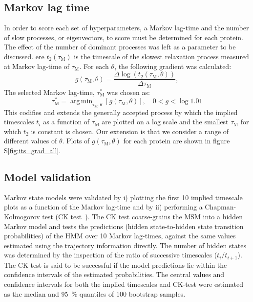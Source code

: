 \documentclass[journal=jacsat,manuscript=article]{achemso}
\DeclareMathOperator*{\argmin}{arg\,min}
\newcommand*\sref[1]{%
    S\ref{#1}}
\begin{document}
\subsection{Markov lag time}
In order to score each set of hyperparameters, a Markov lag-time and the number of slow processes, or eigenvectors, to score must be determined for each protein. The effect of the number of dominant processes was left as a parameter to be discussed. ere $t_{2}(\tau_{\mathrm{M}})$ is the timescale of the slowest relaxation process measured at Markov lag-time of $\tau_{\mathrm{M}}$. 
For each $\theta$, the following gradient was calculated:
\begin{equation}
    g(\tau_{\mathrm{M}}, \theta) = \frac{\Delta \log{\left(t_{2}(\tau_{\mathrm{M}}, \theta)\right)}}{\Delta \tau_{\mathrm{M}}}, 
\end{equation}\label{eqn:choose_lag_1}
The selected Markov lag-time, $\tau^{*}_{\mathrm{M}}$ was chosen as:
\begin{equation}
    \tau^{*}_{\mathrm{M}}  = \argmin_{\tau_{\mathrm{M}}, \theta}\left[g(\tau_{\mathrm{M}}, \theta)\right], \quad 0 < g < \log{1.01}
\end{equation}\label{eqn:choose_lag_2}
This codifies and extends the generally accepted process by which the implied timescales $t_{i}$ as a function of $\tau_{\mathrm{M}}$ are plotted on a log scale and the smallest $\tau_{\mathrm{M}}$ for which $t_{2}$ is constant is chosen. Our extension is that we consider a range of different values of $\theta$. Plots of $g(\tau_{\mathrm{M}}, \theta)$ for each protein are shown  in figure \sref{fig:its_grad_all}. 

\subsection{Model validation}

Markov state models were validated by i) plotting the first \num{10} implied timescale plots as a function of the Markov lag-time and by ii) performing a Chapman-Kolmogorov test (CK test~\cite{noe_projected_2013}). The CK test coarse-grains the MSM into a hidden Markov model and tests the predictions (hidden state-to-hidden state transition probabilities) of the HMM over 10 Markov lag-times, against the same values estimated using the trajectory information directly. The number of hidden states was determined by the inspection of the ratio of successive timescales ($t_{i}/t_{i+1}$). The CK test is said to be successful if the model predictions lie within the confidence intervals of the estimated probabilities. The central values and confidence intervals for both the implied timescales and CK-test were estimated as the median and \SI{95}{\percent} quantiles of \num{100} bootstrap samples. 
\end{document}
